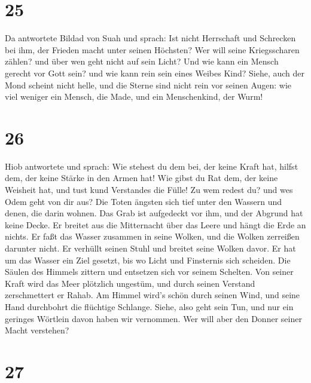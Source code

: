 \hypertarget{section-24}{%
\section{25}\label{section-24}}

 Da antwortete Bildad von Suah und sprach:  Ist
nicht Herrschaft und Schrecken bei ihm, der Frieden macht unter seinen
Höchsten?  Wer will seine Kriegsscharen zählen? und über wen
geht nicht auf sein Licht?  Und wie kann ein Mensch gerecht
vor Gott sein? und wie kann rein sein eines Weibes Kind? 
Siehe, auch der Mond scheint nicht helle, und die Sterne sind nicht rein
vor seinen Augen:  wie viel weniger ein Mensch, die Made,
und ein Menschenkind, der Wurm!

\hypertarget{section-25}{%
\section{26}\label{section-25}}

 Hiob antwortete und sprach:  Wie stehest du dem
bei, der keine Kraft hat, hilfst dem, der keine Stärke in den Armen hat!
 Wie gibst du Rat dem, der keine Weisheit hat, und tust kund
Verstandes die Fülle!  Zu wem redest du? und wes Odem geht
von dir aus?  Die Toten ängsten sich tief unter den Wassern
und denen, die darin wohnen.  Das Grab ist aufgedeckt vor
ihm, und der Abgrund hat keine Decke.  Er breitet aus die
Mitternacht über das Leere und hängt die Erde an nichts.  Er
faßt das Wasser zusammen in seine Wolken, und die Wolken zerreißen
darunter nicht.  Er verhüllt seinen Stuhl und breitet seine
Wolken davor.  Er hat um das Wasser ein Ziel gesetzt, bis
wo Licht und Finsternis sich scheiden.  Die Säulen des
Himmels zittern und entsetzen sich vor seinem Schelten. 
Von seiner Kraft wird das Meer plötzlich ungestüm, und durch seinen
Verstand zerschmettert er Rahab.  Am Himmel wird's schön
durch seinen Wind, und seine Hand durchbohrt die flüchtige Schlange.
 Siehe, also geht sein Tun, und nur ein geringes Wörtlein
davon haben wir vernommen. Wer will aber den Donner seiner Macht
verstehen?

\hypertarget{section-26}{%
\section{27}\label{section-26}}

